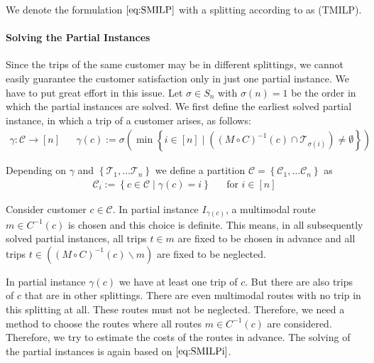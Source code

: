 We denote the formulation $\eqref{eq:SMILP}$ with a splitting according to  as (TMILP).

\paragraph{Solving the Partial Instances} \parfill

Since the trips of the same customer may be in different splittings, we cannot easily guarantee the customer satisfaction only in just one partial instance. We have to put great effort in this issue. Let $\sigma\in S_n$ with $\sigma(n)=1$ be the order in which the partial instances are solved. We first define the earliest solved partial instance, in which a trip of a customer arises, as follows: 
\begin{align*}
	\gamma: \mathcal{C}\to[n] && \gamma(c):=\sigma\left(\min\left\{i\in[n]\mid\left((M\circ C)^{-1}(c)\cap\mathcal{T}_{\sigma(i)}\right)\neq\emptyset\right\}\right)
\end{align*}

Depending on $\gamma$ and $\left\{\mathcal{T}_1,\dots\mathcal{T}_n\right\}$ we define a partition $\mathcal{C}=\left\{\mathcal{C}_1,\dots\mathcal{C}_n\right\}$ as
\begin{align*}
	\mathcal{C}_i := \left\{c\in\mathcal{C}\mid \gamma(c)=i\right\} && \text{for } i\in[n]
\end{align*}

Consider customer $c\in\mathcal{C}$. In partial instance $I_{\gamma(c)}$, a multimodal route $m\in C^{-1}(c)$ is chosen and this choice is definite. This means, in all subsequently solved partial instances, all trips ${t\in m}$ are fixed to be chosen in advance and all trips ${t\in\left((M\circ C)^{-1}(c)\backslash m\right)}$ are fixed to be neglected.

In partial instance $\gamma(c)$ we have at least one trip of $c$. But there are also trips of $c$ that are in other splittings. There are even multimodal routes with no trip in this splitting at all. These routes must not be neglected. Therefore, we need a method to choose the routes where all routes $m\in C^{-1}(c)$ are considered. Therefore, we try to estimate the costs of the routes in advance. The solving of the partial instances is again based on $\eqref{eq:SMILPi}$.

